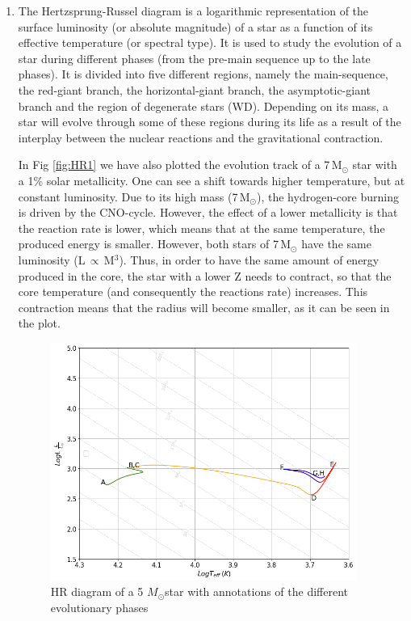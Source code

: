 \documentclass{article}
\newcommand{\msun}{\ensuremath{M_\odot}}
\begin{document}
\begin{enumerate}
    \item  The Hertzsprung-Russel diagram is a logarithmic representation of the surface luminosity (or absolute magnitude) of a star as a function of its effective temperature (or spectral type). It is used to study the evolution of a star during different phases (from the pre-main sequence up to the late phases). It is divided into five different regions, namely the main-sequence, the red-giant branch, the horizontal-giant branch, the asymptotic-giant branch and the region of degenerate stars (WD). Depending on its mass, a star will evolve through some of these regions during its life as a result of the interplay between the nuclear reactions and the gravitational contraction. 
    
    In Fig \ref{fig:HR1} we have also plotted the evolution track of a 7\,M$_{\odot}$ star with a 1\% solar metallicity. One can see a shift towards higher temperature, but at constant luminosity. Due to its high mass (7\,M$_{\odot}$), the hydrogen-core burning is driven by the CNO-cycle. However, the effect of a lower metallicity is that the reaction rate is lower, which means that at the same temperature, the produced energy is smaller. However, both stars of 7\,M$_\odot$ have the same luminosity (L\,$\propto $\,M$^3$). Thus, in order to have the same amount of energy produced in the core, the star with a lower Z needs to contract, so that the core temperature (and consequently the reactions rate) increases. This contraction means that the radius will become smaller, as it can be seen in the plot. 
    
    \begin{figure}[H]
    \centering
    \includegraphics[width=10cm]{plots/HR_5M.pdf}
    \caption{HR diagram of a 5 \msun star with annotations of the different evolutionary phases}
    \label{fig:HR2}
    \end{figure}
    

\end{enumerate}
\end{document}
